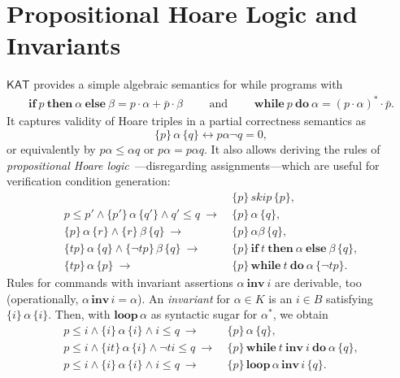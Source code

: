 \documentclass[envcountsame]{llncs}
\newcommand{\IF}[3]{\mathbf{if}\ #1\ \mathbf{then}\ #2\ \mathbf{else}\ #3}
\newcommand{\WHILE}[2]{\mathbf{while}\ #1\ \mathbf{do}\ #2}
\newcommand{\WHILEI}[3]{\mathbf{while}\ #1\ \mathbf{inv}\ #2\ \mathbf{do}\ #3}
\newcommand{\sskip}{\mathit{skip}}
\newcommand{\KAT}{\mathsf{KAT}}
\begin{document}

\section{Propositional Hoare Logic and Invariants}\label{sec:hl-invariants}

$\KAT$ provides a simple algebraic semantics for while
programs with
\begin{align*}
  \IF{p}{\alpha}{\beta} = p\cdot \alpha + \bar p \cdot
  \beta\qquad\text{ and }\qquad
\WHILE{p}{\alpha} = (p\cdot \alpha)^\ast \cdot \bar p.
\end{align*}
It captures validity of Hoare triples in
a partial correctness semantics as
\begin{equation*}
  \{p\}\, \alpha\, \{q\} \leftrightarrow p\alpha\neg q = 0,
\end{equation*}
or equivalently by $p\alpha\le \alpha q$ or $p\alpha = p\alpha q$. It
also allows deriving the rules of \emph{propositional Hoare
  logic}~\cite{Kozen00}---disregarding assignments---which are useful for
verification condition generation:
\begin{align}
  &\{p\}\, \sskip\, \{p\}, \label{eq:h-skip}\tag{h-skip}\\
  p\le p' \land \{p'\}\, \alpha\, \{q'\} \land q'\le q\ \rightarrow\ &
                                                                       \{p\}\,
                                                                       \alpha\,
                                                                       \{q\},\label{eq:h-cons}\tag{h-cons}\\
  \{p\}\, \alpha\, \{r\} \land \{r\}\, \beta\, \{q\}\ \rightarrow\
  &\{p\}\, \alpha\beta\, \{q\},\label{eq:h-seq}\tag{h-seq}\\
  \{tp\}\, \alpha\, \{q\}\land \{\neg tp\}\, \beta\, \{q\}\
  \rightarrow\ & \{p\}\, \IF{t}{\alpha}{\beta}\, \{q\},\label{eq:h-cond}\tag{h-cond}\\
  \{tp\}\, \alpha\, \{p\}\ \rightarrow\ & \{p\}\, \WHILE{t}{\alpha}\, \{\neg tp\}.\label{eq:h-while}\tag{h-while}
\end{align}
Rules for commands with invariant assertions $\alpha\ \mathbf{inv}\ i$
are derivable, too (operationally,
$\alpha\, \mathbf{inv}\, i = \alpha$).  An \emph{invariant} for
$\alpha\in K$ is an $i\in B$ satisfying $\{i\}\, \alpha\, \{i\}$.
Then, with $\mathbf{loop}\, \alpha$ as syntactic sugar for
$\alpha^\ast$, we obtain
\begin{align}
  p\le i \land \{i\}\, \alpha\, \{i\}\land i\le q\ \rightarrow\
  &\{p\}\, \alpha\, \{q\},\label{eq:h-inv}\tag{h-inv}\\
  p \le i \wedge \{it\}\, \alpha\, \{i\} \wedge \neg t i\le q\
  \rightarrow \ & \{p\}\, \WHILEI{t}{i}{\alpha}\,  \{q\},\label{eq:h-while-inv}\tag{h-while-inv}\\
   p\le i \land \{i\}\, \alpha\, \{i\}\land i\le q\ \rightarrow\ &
                                                                   \{p\}\, \mathbf{loop}\, \alpha\,
    \mathbf{inv}\, i\, \{q\}. \label{eq:h-loop-inv}\tag{h-loop-inv}
\end{align}
\end{document}
